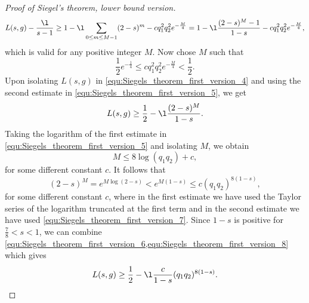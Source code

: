 \begin{proof}[Proof of Siegel's theorem, lower bound version]
      \begin{equation}\label{equ:Siegels_theorem_first_version_4}
        L(s,g)-\frac{\l}{s-1} \ge 1-\l\sum_{0 \le m \le M-1}(2-s)^{m}-cq_{1}^{2}q_{2}^{2}e^{-\frac{M}{4}} = 1-\l\frac{(2-s)^{M}-1}{1-s}-cq_{1}^{2}q_{2}^{2}e^{-\frac{M}{4}},
      \end{equation}
      which is valid for any positive integer $M$. Now chose $M$ such that
      \begin{equation}\label{equ:Siegels_theorem_first_version_5}
        \frac{1}{2}e^{-\frac{1}{4}} \le cq_{1}^{2}q_{2}^{2}e^{-\frac{M}{4}} < \frac{1}{2}.
      \end{equation}
      Upon isolating $L(s,g)$ in \cref{equ:Siegels_theorem_first_version_4} and using the second estimate in \cref{equ:Siegels_theorem_first_version_5}, we get
      \begin{equation}\label{equ:Siegels_theorem_first_version_6}
        L(s,g) \ge \frac{1}{2}-\l\frac{(2-s)^{M}}{1-s}.
      \end{equation}
      Taking the logarithm of the first estimate in \cref{equ:Siegels_theorem_first_version_5} and isolating $M$, we obtain
      \begin{equation}\label{equ:Siegels_theorem_first_version_7}
        M \le 8\log(q_{1}q_{2})+c,
      \end{equation}
      for some different constant $c$. It follows that
      \begin{equation}\label{equ:Siegels_theorem_first_version_8}
        (2-s)^{M} = e^{M\log(2-s)} < e^{M(1-s)} \le c(q_{1}q_{2})^{8(1-s)},
      \end{equation}
      for some different constant $c$, where in the first estimate we have used the Taylor series of the logarithm truncated at the first term and in the second estimate we have used \cref{equ:Siegels_theorem_first_version_7}. Since $1-s$ is positive for $\frac{7}{8} < s < 1$, we can combine \cref{equ:Siegels_theorem_first_version_6,equ:Siegels_theorem_first_version_8} which gives
      \begin{equation}\label{equ:Siegels_theorem_first_version_9}
        L(s,g) \ge \frac{1}{2}-\l\frac{c}{1-s}(q_{1}q_{2})^{8(1-s)}.
      \end{equation}

\end{proof}
